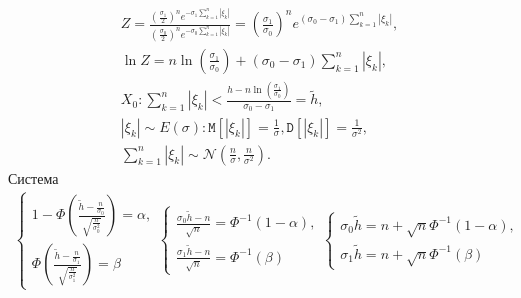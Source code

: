 \documentclass[a4paper,12pt]{article}
\newcommand{\expectation}[1]{\mathtt{M} \left[ #1 \right]}
\newcommand{\variance}[1]{\mathtt{D} \left[ #1 \right]}
\newcommand{\modulus}[1]{\left | #1 \right |}
\begin{document}
\begin{enumerate}
            \begin{gather*}
                  Z
                  = \frac{\left( \frac{\sigma_1}{2} \right)^{n} e^{-\sigma_1 \sum_{k=1}^n \modulus{\xi_k}}}{\left( \frac{\sigma_0}{2} \right)^n e^{-\sigma_0 \sum_{k=1}^n \modulus{\xi_k}}}
                  = \left(  \frac{\sigma_1}{\sigma_0} \right)^n e^{(\sigma_0-\sigma_1) \sum_{k=1}^n \modulus{\xi_k}} , \\
                  \ln Z = n \ln \left( \frac{\sigma_1}{\sigma_0} \right) + (\sigma_0 - \sigma_1) \sum_{k=1}^n \modulus{\xi_k} , \\
                  X_0 : \sum_{k=1}^n \modulus{\xi_k} < \frac{h - n \ln \left( \frac{\sigma_1}{\sigma_0} \right)}{\sigma_0 - \sigma_1} = \widetilde{h} , \\
                  \modulus{\xi_k} \sim E(\sigma) :
                  \expectation{\modulus{\xi_k}} = \frac{1}{\sigma},
                  \variance{\modulus{\xi_k}} = \frac{1}{\sigma^2} , \\
                  \sum_{k=1}^n \modulus{\xi_k} \sim \mathcal{N} \left( \frac{n}{\sigma}, \frac{n}{\sigma^2} \right) .
            \end{gather*}
            Система
            \begin{gather*}
                  \left \{
                  \begin{array}{l}
                        1 - \Phi \left( \frac{\widetilde{h} - \frac{n}{\sigma_0}}{\sqrt{\frac{n}{\sigma_0^2}}} \right ) = \alpha , \\
                        \Phi \left( \frac{\widetilde{h} - \frac{n}{\sigma_1}}{\sqrt{\frac{n}{\sigma_1^2}}} \right ) = \beta
                  \end{array}
                  \right .
                  \left \{
                  \begin{array}{l}
                        \frac{\sigma_0 \widetilde{h} - n}{\sqrt{n}} = \Phi^{-1} (1 - \alpha) , \\
                        \frac{\sigma_1 \widetilde{h} - n}{\sqrt{n}} = \Phi^{-1}(\beta)
                  \end{array}
                  \right .
                  \left \{
                  \begin{array}{l}
                        \sigma_0 \widetilde{h} = n + \sqrt{n} \Phi^{-1} (1 - \alpha) , \\
                        \sigma_1 \widetilde{h} = n + \sqrt{n} \Phi^{-1}(\beta)

\end{array}
\end{gather*}
\end{enumerate}
\end{document}
